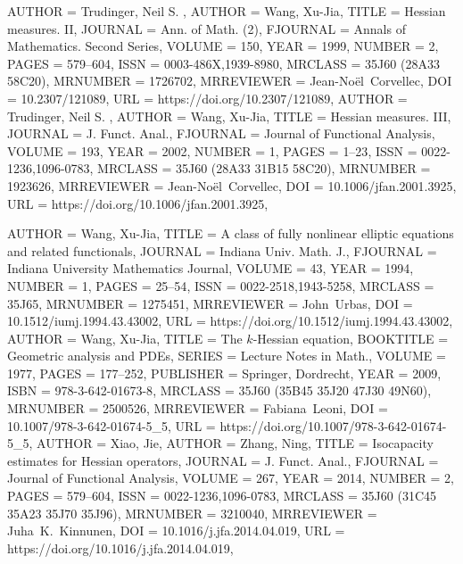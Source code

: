 \documentclass[11pt]{amsart}
\numberwithin{equation}{section}
\numberwithin{equation}{section}
\begin{document}
\begin{bibdiv}
\begin{biblist}
 {
	AUTHOR = {Trudinger, Neil S. },
	AUTHOR = {Wang, Xu-Jia},
	TITLE = {Hessian measures. {II}},
	JOURNAL = {Ann. of Math. (2)},
	FJOURNAL = {Annals of Mathematics. Second Series},
	VOLUME = {150},
	YEAR = {1999},
	NUMBER = {2},
	PAGES = {579--604},
	ISSN = {0003-486X,1939-8980},
	MRCLASS = {35J60 (28A33 58C20)},
	MRNUMBER = {1726702},
	MRREVIEWER = {Jean-No\"el\ Corvellec},
	DOI = {10.2307/121089},
	URL = {https://doi.org/10.2307/121089},
}
 {
	AUTHOR = {Trudinger, Neil S. },
	AUTHOR = {Wang, Xu-Jia},
	TITLE = {Hessian measures. {III}},
	JOURNAL = {J. Funct. Anal.},
	FJOURNAL = {Journal of Functional Analysis},
	VOLUME = {193},
	YEAR = {2002},
	NUMBER = {1},
	PAGES = {1--23},
	ISSN = {0022-1236,1096-0783},
	MRCLASS = {35J60 (28A33 31B15 58C20)},
	MRNUMBER = {1923626},
	MRREVIEWER = {Jean-No\"el\ Corvellec},
	DOI = {10.1006/jfan.2001.3925},
	URL = {https://doi.org/10.1006/jfan.2001.3925},
}
       
 {
	AUTHOR = {Wang, Xu-Jia},
	TITLE = {A class of fully nonlinear elliptic equations and related
		functionals},
	JOURNAL = {Indiana Univ. Math. J.},
	FJOURNAL = {Indiana University Mathematics Journal},
	VOLUME = {43},
	YEAR = {1994},
	NUMBER = {1},
	PAGES = {25--54},
	ISSN = {0022-2518,1943-5258},
	MRCLASS = {35J65},
	MRNUMBER = {1275451},
	MRREVIEWER = {John\ Urbas},
	DOI = {10.1512/iumj.1994.43.43002},
	URL = {https://doi.org/10.1512/iumj.1994.43.43002},
}
 {
	AUTHOR = {Wang, Xu-Jia},
	TITLE = {The {$k$}-{H}essian equation},
	BOOKTITLE = {Geometric analysis and {PDE}s},
	SERIES = {Lecture Notes in Math.},
	VOLUME = {1977},
	PAGES = {177--252},
	PUBLISHER = {Springer, Dordrecht},
	YEAR = {2009},
	ISBN = {978-3-642-01673-8},
	MRCLASS = {35J60 (35B45 35J20 47J30 49N60)},
	MRNUMBER = {2500526},
	MRREVIEWER = {Fabiana\ Leoni},
	DOI = {10.1007/978-3-642-01674-5\_5},
	URL = {https://doi.org/10.1007/978-3-642-01674-5_5},
}
 {
	AUTHOR = {Xiao, Jie},
	AUTHOR = {Zhang, Ning},
	TITLE = {Isocapacity estimates for {H}essian operators},
	JOURNAL = {J. Funct. Anal.},
	FJOURNAL = {Journal of Functional Analysis},
	VOLUME = {267},
	YEAR = {2014},
	NUMBER = {2},
	PAGES = {579--604},
	ISSN = {0022-1236,1096-0783},
	MRCLASS = {35J60 (31C45 35A23 35J70 35J96)},
	MRNUMBER = {3210040},
	MRREVIEWER = {Juha\ K.\ Kinnunen},
	DOI = {10.1016/j.jfa.2014.04.019},
	URL = {https://doi.org/10.1016/j.jfa.2014.04.019},
}

\end{biblist}
\end{bibdiv}
\end{document}
